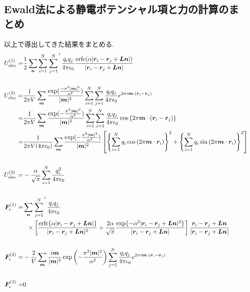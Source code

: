 \subsection{Ewald法による静電ポテンシャル項と力の計算のまとめ}
以上で導出してきた結果をまとめる.
\begin{align}
    U_{\mathrm{elec}}^{(1)}
 =&
    \frac{1}{2} \sum_{\bm{n}} \sum_{i=1}^{N} \left.\sum_{j=1}^{N}\right.^{\prime}
    \frac{q_{i}q_{j}}{4 \pi \epsilon_{0}}
    \frac{\mathrm{erfc}(\alpha |\bm{r}_{i} - \bm{r}_{j} + \bm{Ln}| )}
         {|\bm{r}_{i} - \bm{r}_{j} + \bm{Ln}|}
 \notag
 \\
 \notag
 \\
    U_{\mathrm{elec}}^{(2)}
 =&
    \frac{1}{2 \pi V} \sum_{\bm{m}}
    \frac{\exp(\frac{- \pi^{2}|\bm{m}|^{2}}{\alpha^{2}})}{|\bm{m}|^{2}}
    \sum_{i=1}^{N} \sum_{j=1}^{N}
    \frac{q_{i}q_{j}}{4 \pi \epsilon_{0}}
     e^{2 \pi i \bm{m} \cdot (\bm{r}_{i} - \bm{r}_{j})}
 \notag
 \\
 =&
    \frac{1}{2 \pi V } \sum_{\bm{m}}
    \frac{\exp( -\frac{\pi^{2} |\bm{m}|^{2}}{\alpha^{2}})}{|\bm{m}|^{2}}
    \sum_{i=1}^{N} \sum_{j=1}^{N}
    \frac{q_{i}q_{j} }{4 \pi \epsilon_{0}}
    \cos\left\{ 2 \pi \bm{m} \cdot (\bm{r}_{i} - \bm{r}_{j}) \right\}
 \notag
 \\
 =&\frac{1}{2 \pi V (4 \pi \epsilon_{0})}
    \sum_{\bm{m}}
    \frac{\exp( -\frac{\pi^{2} |\bm{m}|^{2}}{\alpha^{2}})}{|\bm{m}|^{2}}
    \left[
    \left\{
           \sum_{i=1}^{N} q_{i} \cos\left(2 \pi \bm{m} \cdot \bm{r}_{i}\right)
    \right\}^{2}
  +
    \left\{
           \sum_{i=1}^{N} q_{i} \sin\left(2 \pi \bm{m} \cdot \bm{r}_{i}\right)
    \right\}^{2}
    \right]
 \notag
 \\
 \notag
 \\
    U_{\mathrm{elec}}^{(3)}
 =&
   -\frac{\alpha}{\sqrt{\pi}} \sum_{i=1}^{N}\frac{q_{i}^{2}}{4 \pi \epsilon_{0}}
 \notag
 \\
 \notag
 \\
    \bm{F}_{i}^{(1)}
 =&
    \sum_{\bm{n}} \left. \sum_{j=1}^{N} \right.^{\prime}
    \frac{q_{i}q_{j}}{4 \pi \epsilon_{0}}
 \notag
 \\
 &~~\times
    \left[
           \frac{\mathrm{erfc} \{ \alpha |\bm{r}_{i} - \bm{r}_{j} + \bm{Ln}| \} }
                {|\bm{r}_{i} - \bm{r}_{j} + \bm{Ln}|^{2}}
          +\frac{2 \alpha}{\sqrt{\pi}}
           \frac{\exp \{ -\alpha^{2} |\bm{r}_{i} - \bm{r}_{j} + \bm{Ln}|^{2} \}}
                {|\bm{r}_{i} - \bm{r}_{j} + \bm{Ln}|}
    \right]
    \frac{ \bm{r}_{i} - \bm{r}_{j} + \bm{Ln} }
         {|\bm{r}_{i} - \bm{r}_{j} + \bm{Ln}|}
 \notag
 \\
 \notag
 \\
    \bm{F}_{i}^{(2)}
 =&
   -\frac{2}{ V}
    \sum_{\bm{m}} \frac{i \bm{m}}{|\bm{m}|^{2}}
    \exp \left( -\frac{ \pi^{2}|\bm{m}|^{2} }{ \alpha^{2} } \right)
    \sum_{j=1}^{N}
    \frac{q_{i}q_{j}}{4 \pi \epsilon_{0}}
    e^{2 \pi i \bm{m} \cdot (\bm{r}_{i} - \bm{r}_{j})}
 \notag
 \\
 \notag
 \\
    \bm{F}_{i}^{(3)}
 =&
    0
 \notag
\end{align}

